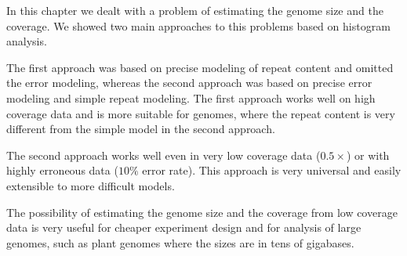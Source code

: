 In this chapter we dealt with a problem of estimating the genome size and the coverage. We showed two main approaches to this problems based on \kmer histogram analysis.

The first approach was based on precise modeling of repeat content and omitted the error modeling, whereas the second approach was based on precise error modeling and simple repeat modeling.
The first approach works well on high coverage data and is more suitable for genomes, where the repeat content is very different from the simple model in the second approach.

The second approach works well even in very low coverage data ($0.5\times$) or with highly erroneous data ($10\%$ error rate). This approach is very universal and easily extensible to more difficult models.

The possibility of estimating the genome size and the coverage from low coverage data is very useful for cheaper experiment design and for analysis of large genomes, such as plant genomes where the sizes are in tens of gigabases.
